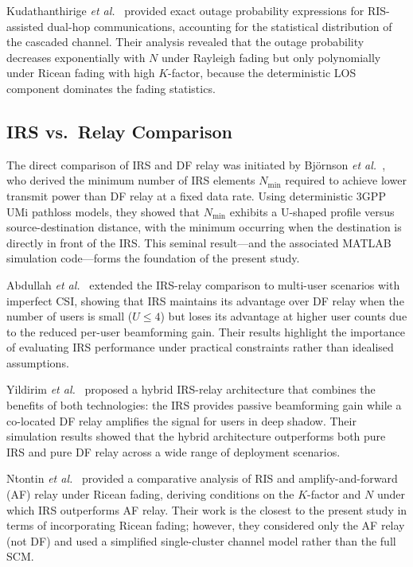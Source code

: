 \documentclass[journal]{IEEEtran} %
\begin{document}
Kudathanthirige \textit{et al.}~\cite{kudathanthirige2020ris_performance} provided exact outage probability expressions for RIS-assisted dual-hop communications, accounting for the statistical distribution of the cascaded channel. Their analysis revealed that the outage probability decreases exponentially with $N$ under Rayleigh fading but only polynomially under Ricean fading with high $K$-factor, because the deterministic LOS component dominates the fading statistics.

\subsection{IRS vs.\ Relay Comparison}

The direct comparison of IRS and DF relay was initiated by Bj\"{o}rnson \textit{et al.}~\cite{bjornson2020irs}, who derived the minimum number of IRS elements $N_{\mathrm{min}}$ required to achieve lower transmit power than DF relay at a fixed data rate. Using deterministic 3GPP UMi pathloss models, they showed that $N_{\mathrm{min}}$ exhibits a U-shaped profile versus source-destination distance, with the minimum occurring when the destination is directly in front of the IRS. This seminal result---and the associated MATLAB simulation code---forms the foundation of the present study.

Abdullah \textit{et al.}~\cite{abdullah2021irs_vs_relay} extended the IRS-relay comparison to multi-user scenarios with imperfect CSI, showing that IRS maintains its advantage over DF relay when the number of users is small ($U \leq 4$) but loses its advantage at higher user counts due to the reduced per-user beamforming gain. Their results highlight the importance of evaluating IRS performance under practical constraints rather than idealised assumptions.

Yildirim \textit{et al.}~\cite{yildirim2021hybrid_irs_relay} proposed a hybrid IRS-relay architecture that combines the benefits of both technologies: the IRS provides passive beamforming gain while a co-located DF relay amplifies the signal for users in deep shadow. Their simulation results showed that the hybrid architecture outperforms both pure IRS and pure DF relay across a wide range of deployment scenarios.

Ntontin \textit{et al.}~\cite{ntontin2022ris_vs_relay} provided a comparative analysis of RIS and amplify-and-forward (AF) relay under Ricean fading, deriving conditions on the $K$-factor and $N$ under which IRS outperforms AF relay. Their work is the closest to the present study in terms of incorporating Ricean fading; however, they considered only the AF relay (not DF) and used a simplified single-cluster channel model rather than the full SCM.
\end{document}
